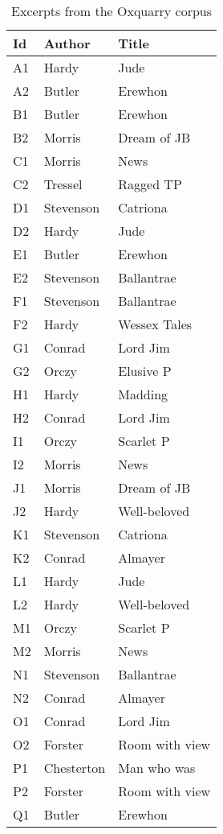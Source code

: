 \begin{table}
  \caption{Excerpts from the Oxquarry corpus}
  \label{tbl:oxquarry_corpus}
  \begin{tabular}{|l|l|l|}
    \hline
    \textbf{Id} & \textbf{Author} & \textbf{Title} \\ \hline
    A1 & Hardy & Jude \\
    A2 & Butler & Erewhon \\
    B1 & Butler & Erewhon \\
    B2 & Morris & Dream of JB \\
    C1 & Morris & News \\
    C2 & Tressel & Ragged TP \\
    D1 & Stevenson & Catriona \\
    D2 & Hardy & Jude \\
    E1 & Butler & Erewhon \\
    E2 & Stevenson & Ballantrae \\
    F1 & Stevenson & Ballantrae \\
    F2 & Hardy & Wessex Tales \\
    G1 & Conrad & Lord Jim \\
    G2 & Orczy & Elusive P \\
    H1 & Hardy & Madding \\
    H2 & Conrad & Lord Jim \\
    I1 & Orczy & Scarlet P \\
    I2 & Morris & News \\
    J1 & Morris & Dream of JB \\
    J2 & Hardy & Well-beloved \\
    K1 & Stevenson & Catriona \\
    K2 & Conrad & Almayer \\
    L1 & Hardy & Jude \\
    L2 & Hardy & Well-beloved \\
    M1 & Orczy & Scarlet P \\
    M2 & Morris & News \\
    N1 & Stevenson & Ballantrae \\
    N2 & Conrad & Almayer \\
    O1 & Conrad & Lord Jim \\
    O2 & Forster & Room with view \\
    P1 & Chesterton & Man who was \\
    P2 & Forster & Room with view \\
    Q1 & Butler & Erewhon \\

\end{tabular}
\end{table}
